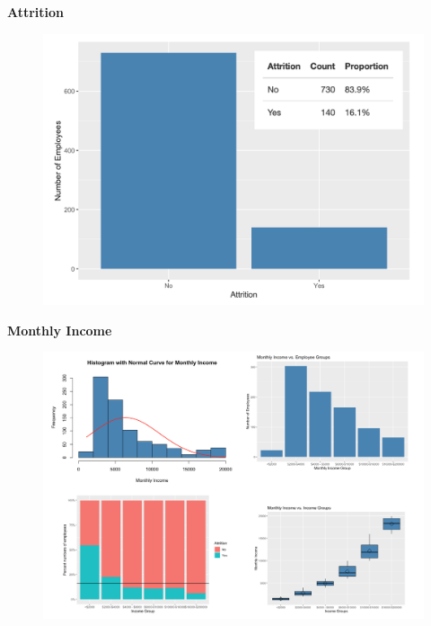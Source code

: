 \documentclass[notes,11pt]{beamer}
\begin{document}
\begin{frame}
\begin{center}
\textbf{\color{blue}\Large{ Attrition}}
\end{center}\medskip
\begin{figure}
\includegraphics[scale=0.5]{PIC2}
\end{figure}


\end{frame}






\begin{frame}
\begin{center}
\textbf{\color{blue}\Large{Monthly Income}}
\end{center}\medskip
\begin{figure}
\includegraphics[scale=0.45]{PIC3}
\end{figure}


\end{frame}
\end{document}
